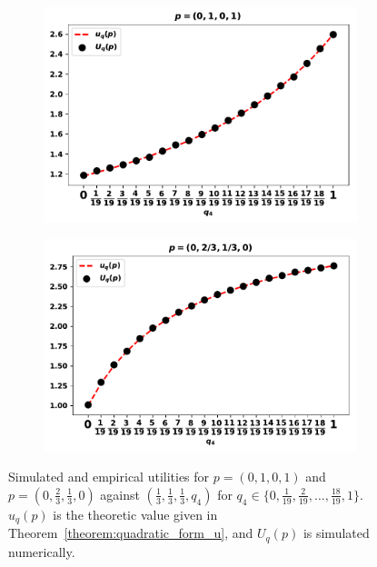 \begin{figure}[!htbp]
    \begin{center}
        \begin{subfigure}{0.45\textwidth}
            \includegraphics[width=\linewidth]{src/chapters/chapters-05/paper/Memory-size-in-the-prisoners-dilemma/img/validation_against_player_one.pdf}
        \end{subfigure}
        \begin{subfigure}{0.45\textwidth}
            \includegraphics[width=\linewidth]{src/chapters/chapters-05/paper/Memory-size-in-the-prisoners-dilemma/img/validation_against_player_two.pdf}
        \end{subfigure}
    \end{center}
    \caption{Simulated and empirical utilities for \(p = (0, 1, 0, 1)\)
    and \(p = (0, \frac{2}{3}, \frac{1}{3}, 0)\) against \((\frac{1}{3}, \frac{1}{3}, \frac{1}{3}, q_4)\) for
    \(q_4 \in \{0,  \frac{1}{19}, \frac{2}{19}, \dots, \frac{18}{19}, 1\}\).
    \(u_q(p)\) is the theoretic value given in Theorem~\ref{theorem:quadratic_form_u},
    and \(U_q(p)\) is simulated numerically.}
    \label{fig:analytical_simulated}
\end{figure}

